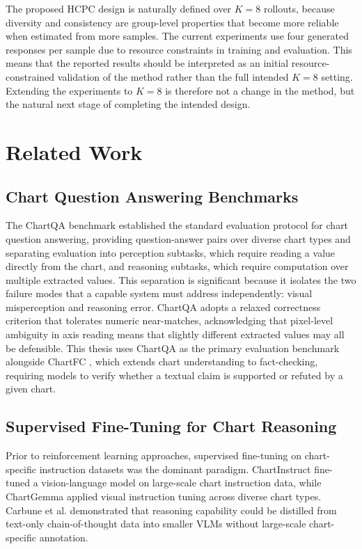 \documentclass{iutbscthesis}
\begin{document}
The proposed HCPC design is naturally defined over $K=8$ rollouts, because diversity and consistency are group-level properties that become more reliable when estimated from more samples. The current experiments use four generated responses per sample due to resource constraints in training and evaluation. This means that the reported results should be interpreted as an initial resource-constrained validation of the method rather than the full intended $K=8$ setting. Extending the experiments to $K=8$ is therefore not a change in the method, but the natural next stage of completing the intended design.


\section{Related Work}

\subsection{Chart Question Answering Benchmarks}

The ChartQA benchmark \cite{masry2022chartqa} established the standard evaluation
protocol for chart question answering, providing question-answer pairs over diverse
chart types and separating evaluation into perception subtasks, which require reading
a value directly from the chart, and reasoning subtasks, which require computation
over multiple extracted values. This separation is significant because it isolates the
two failure modes that a capable system must address independently: visual
misperception and reasoning error. ChartQA adopts a relaxed correctness criterion
that tolerates numeric near-matches, acknowledging that pixel-level ambiguity in
axis reading means that slightly different extracted values may all be defensible.
This thesis uses ChartQA as the primary evaluation benchmark alongside ChartFC
\cite{akhtar2023chartfc}, which extends chart understanding to fact-checking, requiring
models to verify whether a textual claim is supported or refuted by a given chart.

\subsection{Supervised Fine-Tuning for Chart Reasoning}

Prior to reinforcement learning approaches, supervised fine-tuning on chart-specific
instruction datasets was the dominant paradigm. ChartInstruct \cite{liu2024chartinstruct}
fine-tuned a vision-language model on large-scale chart instruction data, while
ChartGemma \cite{masry2024chartgemma} applied visual instruction tuning across
diverse chart types. Carbune et al. \cite{carbune2024chart} demonstrated that
reasoning capability could be distilled from text-only chain-of-thought data into
smaller VLMs without large-scale chart-specific annotation.
\end{document}

